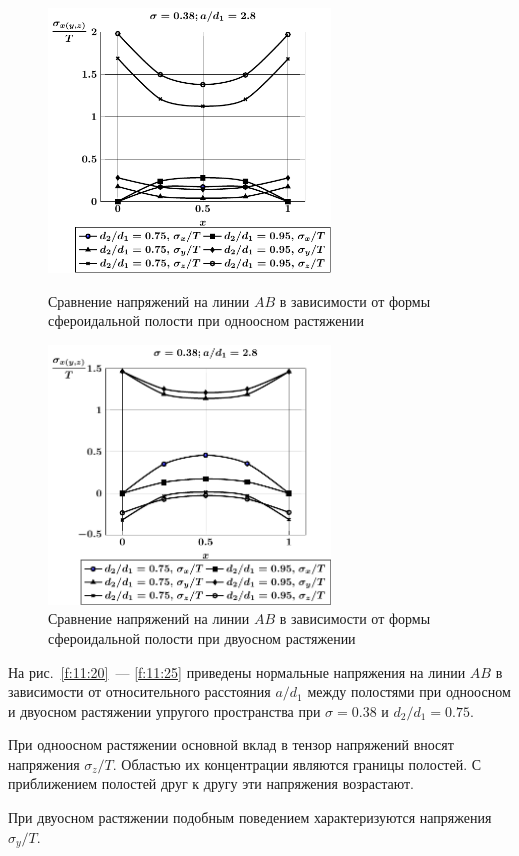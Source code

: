 \begin{figure}[h!]
\centering\footnotesize
\parbox[b]{7.5cm}{\centering\includegraphics[width=7.5cm]{periodic-cav27-d-a28-t1.pdf}
\caption{Сравнение напряжений на линии $AB$ в зависимости от формы сфероидальной полости при одноосном растяжении
\label{f:11:31}}}\hfil\hfil
\parbox[b]{7.5cm}{\centering\includegraphics[width=7.5cm]{periodic-cav27-d-a28-t2.pdf}
\caption{Сравнение напряжений на линии $AB$ в зависимости от формы сфероидальной полости при двуосном растяжении
\label{f:11:32}}}
\end{figure}

На рис.~\ref{f:11:20}~--- \ref{f:11:25} приведены нормальные напряжения на линии $AB$ в зависимости от относительного расстояния $a/d_1$ между полостями при одноосном и двуосном растяжении упругого пространства при $\sigma=0.38$ и $d_2/d_1=0.75$.

При одноосном растяжении основной вклад в тензор напряжений вносят напряжения $\sigma_z/T$. Областью их концентрации являются границы полостей. С приближением полостей друг к другу эти напряжения возрастают.

При двуосном растяжении подобным поведением характеризуются напряжения $\sigma_y/T$.

